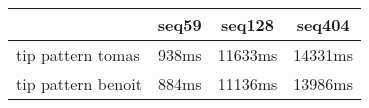 \begin{tabular}{|l|c|c|c|}
\hline
 & seq59 & seq128 & seq404  \\
\hline
tip pattern tomas &  938ms &  11633ms &  14331ms\\
\hline
tip pattern benoit &  884ms &  11136ms &  13986ms\\
\hline
\end{tabular}
